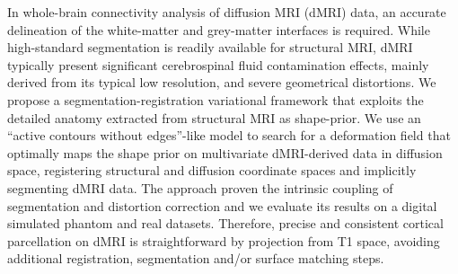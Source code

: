 In whole-brain connectivity analysis of diffusion MRI (dMRI) data,
an accurate delineation of the white-matter and grey-matter 
interfaces is required. While high-standard segmentation is readily 
available for structural MRI, dMRI typically present significant cerebrospinal
fluid contamination effects, mainly derived from its typical low resolution,
and severe geometrical distortions. We propose a segmentation-registration 
variational framework that exploits the detailed anatomy extracted from 
structural MRI as shape-prior. We use an ``active contours without edges''-like 
model to search for a deformation field that optimally maps the shape prior 
on multivariate dMRI-derived data in diffusion space, registering structural
and diffusion coordinate spaces and implicitly segmenting dMRI data. The approach
proven the intrinsic coupling of segmentation and distortion correction and
we evaluate its results on a digital simulated phantom and real datasets. 
Therefore, precise and consistent cortical parcellation on dMRI is 
straightforward by projection from T1 space, avoiding additional registration,
segmentation and/or surface matching steps.